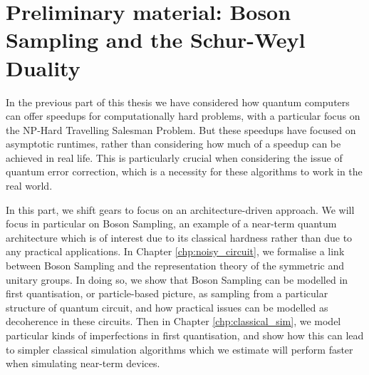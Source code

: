 \chapter{Preliminary material: Boson Sampling and the Schur-Weyl Duality}
\label{chp:preliminary_bs}


In the previous part of this thesis we have considered how quantum computers can offer speedups for computationally hard problems, with a particular focus on the NP-Hard Travelling Salesman Problem. But these speedups have focused on asymptotic runtimes, rather than considering how much of a speedup can be achieved in real life. This is particularly crucial when considering the issue of quantum error correction, which is a necessity for these algorithms to work in the real world.

In this part, we shift gears to focus on an architecture-driven approach. We will focus in particular on Boson Sampling, an example of a near-term quantum architecture which is of interest due to its classical hardness rather than due to any practical applications. In Chapter \ref{chp:noisy_circuit}, we formalise a link between Boson Sampling and the representation theory of the symmetric and unitary groups. In doing so, we show that Boson Sampling can be modelled in first quantisation, or particle-based picture, as sampling from a particular structure of quantum circuit, and how practical issues can be modelled as decoherence in these circuits. Then in Chapter \ref{chp:classical_sim}, we model particular kinds of imperfections in first quantisation, and show how this can lead to simpler classical simulation algorithms which we estimate will perform faster when simulating near-term devices.

